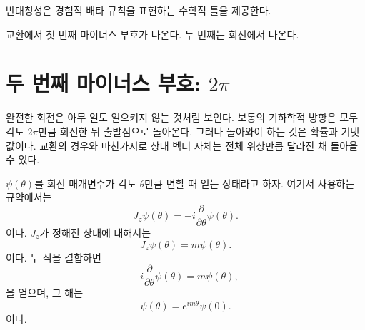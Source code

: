 반대칭성은 경험적 배타 규칙을 표현하는 수학적 틀을 제공한다.

\begin{classroomqa}
\end{classroomqa}

교환에서 첫 번째 마이너스 부호가 나온다. 두 번째는 회전에서 나온다.

\section{두 번째 마이너스 부호: \texorpdfstring{\(2\pi\)}{2 pi}}

완전한 회전은 아무 일도 일으키지 않는 것처럼 보인다. 보통의 기하학적 방향은 모두 각도 \(2\pi\)만큼 회전한 뒤 출발점으로 돌아온다. 그러나 돌아와야 하는 것은 확률과 기댓값이다. 교환의 경우와 마찬가지로 상태 벡터 자체는 전체 위상만큼 달라진 채 돌아올 수 있다.

\begin{classroomqa}
\end{classroomqa}


\(\psi(\theta)\)를 회전 매개변수가 각도 \(\theta\)만큼 변할 때 얻는 상태라고 하자. 여기서 사용하는 규약에서는
\begin{equation}
J_z\psi(\theta)
=
-i\frac{\partial}{\partial\theta}\psi(\theta).
\end{equation}
이다. \(J_z\)가 정해진 상태에 대해서는
\begin{equation}
J_z\psi(\theta)=m\psi(\theta).
\end{equation}
이다. 두 식을 결합하면
\begin{equation}
-i\frac{\partial}{\partial\theta}\psi(\theta)
=
m\psi(\theta),
\end{equation}
을 얻으며, 그 해는
\begin{equation}
\psi(\theta)=e^{im\theta}\psi(0).
\end{equation}
이다.

